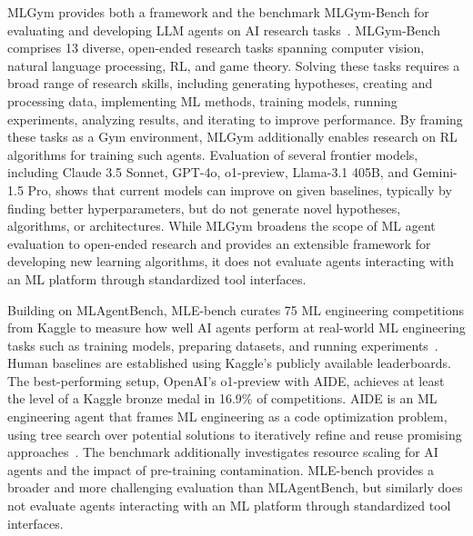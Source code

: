 \documentclass[
english,                 %
bibtex,                  %
]{kththesis}
\numberwithin{listing}{chapter}
\begin{document}
\gls{ML}Gym provides both a framework and the benchmark \gls{ML}Gym-Bench for evaluating and developing \gls{LLM} agents on \gls{AI} research tasks~\cite{nathani_mlgym_2025}. \gls{ML}Gym-Bench comprises 13 diverse, open-ended research tasks spanning computer vision, natural language processing, \gls{RL}, and game theory. Solving these tasks requires a broad range of research skills, including generating hypotheses, creating and processing data, implementing \gls{ML} methods, training models, running experiments, analyzing results, and iterating to improve performance. By framing these tasks as a Gym environment, \gls{ML}Gym additionally enables research on \gls{RL} algorithms for training such agents. Evaluation of several frontier models, including Claude 3.5 Sonnet, \gls{GPT}-4o, o1-preview, Llama-3.1 405B, and Gemini-1.5 Pro, shows that current models can improve on given baselines, typically by finding better hyperparameters, but do not generate novel hypotheses, algorithms, or architectures. While \gls{ML}Gym broadens the scope of \gls{ML} agent evaluation to open-ended research and provides an extensible framework for developing new learning algorithms, it does not evaluate agents interacting with an \gls{ML} platform through standardized tool interfaces.

Building on \gls{ML}AgentBench, \gls{MLE}-bench curates 75 \gls{ML} engineering competitions from Kaggle to measure how well \gls{AI} agents perform at real-world \gls{ML} engineering tasks such as training models, preparing datasets, and running experiments~\cite{chan_mle-bench_2025}. Human baselines are established using Kaggle's publicly available leaderboards. The best-performing setup, \gls{OpenAI}'s o1-preview with \gls{AIDE}, achieves at least the level of a Kaggle bronze medal in 16.9\% of competitions. \Gls{AIDE} is an \gls{ML} engineering agent that frames \gls{ML} engineering as a code optimization problem, using tree search over potential solutions to iteratively refine and reuse promising approaches~\cite{jiang_aide_2025}. The benchmark additionally investigates resource scaling for \gls{AI} agents and the impact of pre-training contamination. \Gls{MLE}-bench provides a broader and more challenging evaluation than \gls{ML}AgentBench, but similarly does not evaluate agents interacting with an \gls{ML} platform through standardized tool interfaces.
\end{document}
